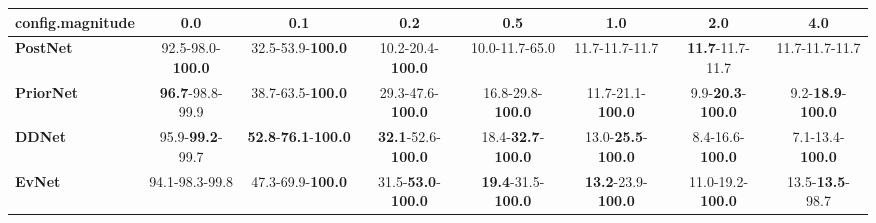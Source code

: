 \begin{tabular}{lccccccc}
\toprule
\textbf{config.magnitude} &                       0.0 &                                         0.1 &                                0.2 &                                0.5 &                                1.0 &                               2.0 &                               4.0 \\
\midrule
\textbf{PostNet } &  92.5-98.0-\textbf{100.0} &                    32.5-53.9-\textbf{100.0} &           10.2-20.4-\textbf{100.0} &                     10.0-11.7-65.0 &                     11.7-11.7-11.7 &           \textbf{11.7}-11.7-11.7 &                    11.7-11.7-11.7 \\
\textbf{PriorNet} &   \textbf{96.7}-98.8-99.9 &                    38.7-63.5-\textbf{100.0} &           29.3-47.6-\textbf{100.0} &           16.8-29.8-\textbf{100.0} &           11.7-21.1-\textbf{100.0} &  9.9-\textbf{20.3}-\textbf{100.0} &                       9.2-\textbf{18.9}-\textbf{100.0} \\
\textbf{DDNet   } &   95.9-\textbf{99.2}-99.7 &  \textbf{52.8}-\textbf{76.1}-\textbf{100.0} &  \textbf{32.1}-52.6-\textbf{100.0} &  18.4-\textbf{32.7}-\textbf{100.0} &  13.0-\textbf{25.5}-\textbf{100.0} &           8.4-16.6-\textbf{100.0} &           7.1-13.4-\textbf{100.0} \\
\textbf{EvNet   } &            94.1-98.3-99.8 &                    47.3-69.9-\textbf{100.0} &  31.5-\textbf{53.0}-\textbf{100.0} &  \textbf{19.4}-31.5-\textbf{100.0} &  \textbf{13.2}-23.9-\textbf{100.0} &          11.0-19.2-\textbf{100.0} &  13.5-\textbf{13.5}-98.7 \\
\bottomrule
\end{tabular}
